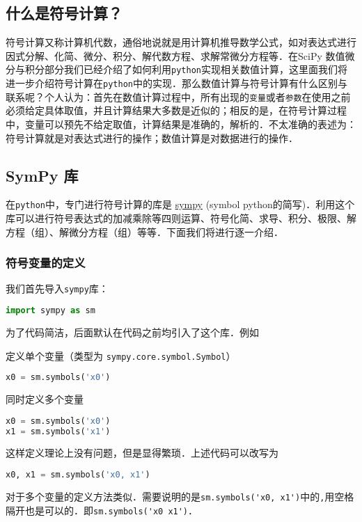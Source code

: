 
\subsection{什么是符号计算？}
符号计算又称计算机代数，通俗地说就是用计算机推导数学公式，如对表达式进行因式分解、化简、微分、积分、解代数方程、求解常微分方程等．在SciPy 数值微分与积分部分我们已经介绍了如何利用\verb|python|实现相关数值计算，这里面我们将进一步介绍符号计算在\verb|python|中的实现．那么数值计算与符号计算有什么区别与联系呢？个人认为：首先在数值计算过程中，所有出现的\verb|变量|或者\verb|参数|在使用之前必须给定具体取值，并且计算结果大多数是近似的；相反的是，在符号计算过程中，变量可以预先不给定取值，计算结果是准确的，解析的．不太准确的表述为：符号计算就是对表达式进行的操作；数值计算是对数据进行的操作．

\subsection{SymPy 库}
在\verb|python|中，专门进行符号计算的库是 \href{https://www.sympy.org/en/index.html}{sympy} (symbol python的简写)．利用这个库可以进行符号表达式的加减乘除等四则运算、符号化简、求导、积分、极限、解方程（组）、解微分方程（组）等等．下面我们将进行逐一介绍．

\subsubsection{符号变量的定义}
我们首先导入\verb|sympy|库：
\begin{lstlisting}[language=python]
import sympy as sm
\end{lstlisting}
为了代码简洁，后面默认在代码之前均引入了这个库．例如

定义单个变量（类型为 \verb|sympy.core.symbol.Symbol|）
\begin{lstlisting}[language=python]
x0 = sm.symbols('x0')
\end{lstlisting}
同时定义多个变量
\begin{lstlisting}[language=python]
x0 = sm.symbols('x0')
x1 = sm.symbols('x1')
\end{lstlisting}
这样定义理论上没有问题，但是显得繁琐．上述代码可以改写为
\begin{lstlisting}[language=python]
x0, x1 = sm.symbols('x0, x1')
\end{lstlisting}
对于多个变量的定义方法类似．需要说明的是\verb|sm.symbols('x0, x1')|中的\verb|,|用空格隔开也是可以的．即\verb|sm.symbols('x0 x1')|．

